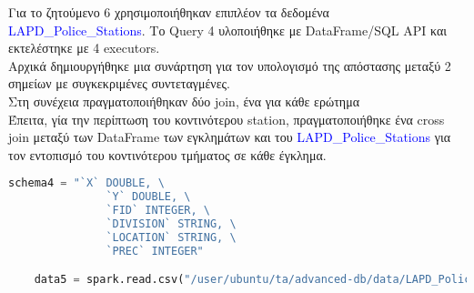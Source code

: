 \documentclass{article}
\begin{document}
Για το ζητούμενο 6 χρησιμοποιήθηκαν επιπλέον τα δεδομένα \textcolor{blue}{LAPD\_Police\_Stations}. 
Το Query 4 υλοποιήθηκε με DataFrame/SQL API και εκτελέστηκε με 4 executors.  \\
Αρχικά δημιουργήθηκε μια συνάρτηση για τον υπολογισμό της απόστασης μεταξύ 2 σημείων με 
συγκεκριμένες συντεταγμένες. \\
Στη συνέχεια πραγματοποιήθηκαν δύο join, ένα για κάθε ερώτημα \\
Έπειτα, γία την περίπτωση του κοντινότερου station, πραγματοποιήθηκε ένα cross join μεταξύ των DataFrame των εγκλημάτων και 
του \textcolor{blue}{LAPD\_Police\_Stations} για τον εντοπισμό του κοντινότερου τμήματος σε κάθε έγκλημα. 

\begin{lstlisting}[language = Python]
    schema4 = "`X` DOUBLE, \
               `Y` DOUBLE, \
               `FID` INTEGER, \
               `DIVISION` STRING, \
               `LOCATION` STRING, \
               `PREC` INTEGER"

    data5 = spark.read.csv("/user/ubuntu/ta/advanced-db/data/LAPD_Police_Stations.csv", header=True, schema=schema4)


\end{lstlisting}
    
\end{document}
